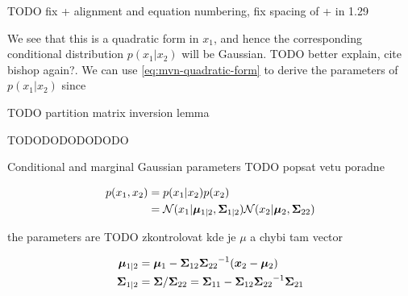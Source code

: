 {TODO fix + alignment and equation numbering, fix spacing of + in 1.29}

We see that this is a quadratic form in $x_1$, and hence the corresponding
conditional distribution $p(x_1 | x_2)$ will be Gaussian. {TODO better explain,
cite bishop again?}. We can use \eqref{eq:mvn-quadratic-form} to derive the
parameters of $p(x_1 | x_2)$ since

{TODO partition matrix inversion lemma}

\citep{murphy2012machine}




TODODODODODODO


\begin{thm}
  Conditional and marginal Gaussian parameters \citep{murphy2012machine} {TODO popsat vetu poradne}

  \begin{align}
    p(x_1, x_2) &= p(x_1 | x_2) p(x_2) \\
                &= {\mathcal{N}}(x_1 | {\bm{\mu}}_{1|2}, {{\bm{\Sigma}}_{1|2}}) {\mathcal{N}}(x_2 | {\bm{\mu}}_2, {{\bm{\Sigma}}_{22}})
  \end{align}

  the parameters are {TODO zkontrolovat kde je $\mu$ a chybi tam vector}

  \begin{align}
    {\bm{\mu}}_{1|2} &= {\bm{\mu}}_1 - {{\bm{\Sigma}}_{12}} {{\bm{\Sigma}}_{22}}^{-1} ({\bm{x}}_2 - {\bm{\mu}}_2) \\
    {{\bm{\Sigma}}_{1|2}} &= {\bm{\Sigma}} / {{\bm{\Sigma}}_{22}} = {{\bm{\Sigma}}_{11}} - {{\bm{\Sigma}}_{12}} {{\bm{\Sigma}}_{22}}^{-1} {{\bm{\Sigma}}_{21}}
  \end{align}
\end{thm}


